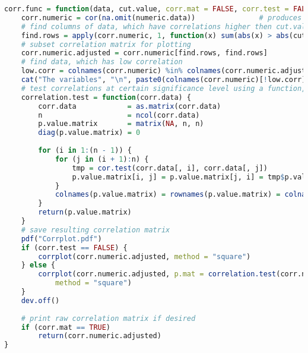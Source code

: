 \begin{lstlisting}[language=R]
corr.func = function(data, cut.value, corr.mat = FALSE, corr.test = FALSE, significance = 0.05) {
    corr.numeric = cor(na.omit(numeric.data))               # produces correlation matrix of all numeric variables in the dataset
    # find columns of data, which have correlations higher then cut.value
    find.rows = apply(corr.numeric, 1, function(x) sum(abs(x) > abs(cut.value)) > 1)
    # subset correlation matrix for plotting
    corr.numeric.adjusted = corr.numeric[find.rows, find.rows]
    # find data, which has low correlation
    low.corr = colnames(corr.numeric) %in% colnames(corr.numeric.adjusted)
    cat("The variables", "\n", paste0(colnames(corr.numeric)[!low.corr], collapse = ", "), "\n", "have very low bivariate correlations with the other numeric variables in the training data set!")
    # test correlations at certain significance level using a function, that produces a p-value matrix for all bivariate correlations
    correlation.test = function(corr.data) {
        corr.data            = as.matrix(corr.data)
        n                    = ncol(corr.data)
        p.value.matrix       = matrix(NA, n, n)
        diag(p.value.matrix) = 0
        
        for (i in 1:(n - 1)) {
            for (j in (i + 1):n) {
                tmp = cor.test(corr.data[, i], corr.data[, j])            # testing correlation
                p.value.matrix[i, j] = p.value.matrix[j, i] = tmp$p.value # filling p-value matrix with respective p-values
            }
            colnames(p.value.matrix) = rownames(p.value.matrix) = colnames(corr.numeric.adjusted)
        }
        return(p.value.matrix)
    }
    # save resulting correlation matrix
    pdf("Corrplot.pdf")
    if (corr.test == FALSE) {
        corrplot(corr.numeric.adjusted, method = "square")
    } else {
        corrplot(corr.numeric.adjusted, p.mat = correlation.test(corr.numeric.adjusted), sig.level = significance, 
            method = "square")
    }
    dev.off()
    
    # print raw correlation matrix if desired
    if (corr.mat == TRUE) 
        return(corr.numeric.adjusted)
}
\end{lstlisting}